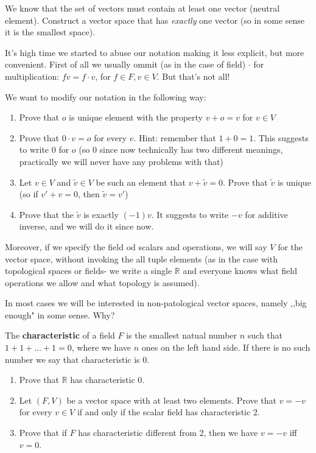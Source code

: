 \begin{prob}
  We know that the set of vectors must contain at least one vector (neutral element). Construct a vector space that has \textit{exactly} one vector (so in some sense
  it is the smallest space).
\end{prob}

It's high time we started to abuse our notation making it less explicit, but more convenient. First of all we usually ommit
(as in the case of field) $\cdot$ for multiplication: $fv=f\cdot v$, for $f\in F, v\in V$. But that's not all!
\begin{prob}
  We want to modify our notation in the following way:
  \begin{enumerate}
    \item Prove that $o$ is unique element with the property $v+o=v$ for $v\in V$
    \item Prove that $0\cdot v=o$ for every $v$. Hint: remember that $1+0=1$. This suggests to write 0 for $o$ (so 0 since now technically has two different meanings,
      practically we will never have any problems with that)
    \item Let $v\in V$ and $\tilde v\in V$ be such an element that $v+\tilde v=0$. Prove that $\tilde v$ is unique (so if $v'+v=0$, then $\tilde v=v'$)
    \item Prove that the $\tilde v$ is exactly $(-1)v$. It suggests to write $-v$ for additive inverse, and we will do it since now.
  \end{enumerate}
\end{prob}

Moreover, if we specify the field od scalars and operations, we will say $V$ for the vector space, without invoking the all tuple elements (as in the case with topological spaces or fields- we write a single $\mathbb R$ and everyone knows what field operations we allow and what topology is assumed).

In most cases we will be interested in non-patological vector spaces, namely ,,big enough" in some sense. Why?

\begin{prob}
  The \textbf{characteristic} of a field $F$ is the smallest natual number $n$ such that $1+1+\dots+1=0$, where we have $n$ ones on the left hand side. If there is no such number
  we say that characteristic is 0.
  \begin{enumerate}
    \item Prove that $\mathbb R$ has characteristic 0.
    \item Let $(F, V)$ be a vector space with at least two elements. Prove that $v=-v$ for every $v\in V$ if and only if the scalar field has characteristic 2.
    \item Prove that if $F$ has characteristic different from 2, then we have $v=-v$ iff $v=0$.
  \end{enumerate}
\end{prob}

